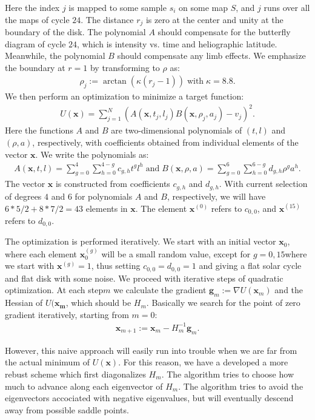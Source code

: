 \documentclass{aa}
\newcommand{\eqnl}[2]{\begin{eqnarray}\label{#1}#2\end{eqnarray}}
\begin{document}
  Here the index $j$ is mapped to some sample $s_i$ on some map $S$, and $j$ runs over all the maps of cycle $24$. The 
  distance $r_j$ is zero at the center and unity at the boundary of the disk.
    The polynomial $A$ should compensate for the butterfly diagram of cycle $24$, which is intensity vs. time and heliographic latitude. Meanwhile, the polynomial $B$ should compensate any limb effects.
  We emphasize the boundary at $r=1$ by transforming to $\rho$ as:
  \eqnl{physical_radius_trans}{
  \rho_j := \arctan \left( \kappa \left( r_j - 1 \right)\right) \; \text{with} \; \kappa = 8.8 \text{.}
  }
  We then perform an optimization to 
  minimize a target function:
  \eqnl{physical_radius_target}{
  U(\bm{x}) = \sum \limits_{j=1}^{N} \left( A(\bm{x},t_j,l_j) B(\bm{x},\rho_j,a_j) - v_j \right)^2 \text{.}
  }
  Here the functions $A$ and $B$ are two-dimensional polynomials of $(t,l)$ and $(\rho,a)$, respectively, with coefficients obtained from individual elements of the vector $\bm{x}$. We write the polynomials as:
  \eqnl{physical_radius_polynomials}{
  A(\bm{x},t,l) = \sum \limits_{g=0}^{4} \sum \limits_{h=0}^{4-g} c_{g,h} t^g l^h \; \text{and} \;
  B(\bm{x},\rho,a) = \sum \limits_{g=0}^{6} \sum \limits_{h=0}^{6-g} d_{g,h} \rho^g a^h \text{.}
  }
  The vector $\bm{x}$ is constructed from coefficients $c_{g,h}$ and $d_{g,h}$. With current selection of degrees $4$ 
  and $6$ for polynomials $A$ and $B$, respectively, we will have $6*5/2 + 8*7/2 = 43$ elements in $\bm{x}$. The element 
  $\bm{x}^{(0)}$ refers to $c_{0,0}$, and $\bm{x}^{(15)}$ refers to $d_{0,0}$.

  The optimization is performed iteratively. We start with an initial vector $\bm{x}_0$, where each element 
  $\bm{x}_0^{(g)}$ will be a small random value, except for $g=0,15$where we start with $\bm{x}^{(g)} = 1$, thus 
  setting $c_{0,0} = d_{0,0} = 1$ and giving a flat solar cycle and flat disk with some noise. We proceed with iterative 
  steps of quadratic optimization. At each step$m$ we calculate the gradient $\bm{g}_m := \nabla U(\bm{x}_m)$ and the Hessian of $U(\bm{x_m}$, which should be $H_m$. Basically we search for the point of zero gradient iteratively, starting from $m=0$:
  \eqnl{physical_radius_step}{
  \bm{x}_{m+1} := \bm{x}_m - H_m^{-1} \bm{g}_m \text{.}
  }

  However, this naive approach will easily run into trouble when we are far from the actual minimum of $U(\bm{x})$. For 
  this reason, we have a developed a more rebust scheme which first diagonalizes $H_m$. The algorithm tries to choose 
  how much to advance along each eigenvector of $H_m$. The algorithm tries to avoid the eigenvectors accociated with 
  negative eigenvalues, but will eventually descend away from possible saddle points.
  
\end{document}
